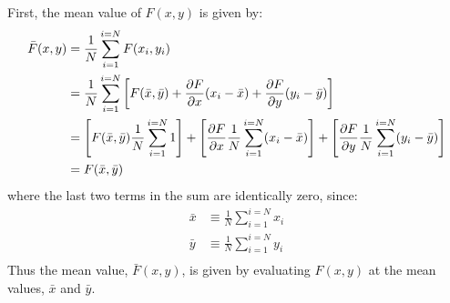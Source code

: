 First, the mean value of $F(x,y)$ is given by:
\begin{align}
\bar F(x,y)&=\frac{1}{N}\sum_{i=1}^{i=N}F(x_i,y_i)\nonumber\\
&=\frac{1}{N}\sum_{i=1}^{i=N} \left[ F(\bar x,\bar y)+\frac{\partial F}{\partial x}(x_i-\bar x)+\frac{\partial F}{\partial y}(y_i-\bar y)  \right]\nonumber\\
&=\left[F(\bar x,\bar y)\frac{1}{N}\sum_{i=1}^{i=N}1 \right]+\left[\frac{\partial F}{\partial x}\frac{1}{N}\sum_{i=1}^{i=N}(x_i-\bar x) \right]+\left[\frac{\partial F}{\partial y}\frac{1}{N}\sum_{i=1}^{i=N}(y_i-\bar y) \right]\nonumber\\
&=F(\bar x,\bar y)
\end{align}
where the last two terms in the sum are identically zero, since:
\begin{align}
\bar x &\equiv \frac{1}{N}\sum_{i=1}^{i=N}x_i\nonumber\\
\bar y &\equiv \frac{1}{N}\sum_{i=1}^{i=N}y_i\nonumber\\
\end{align} 
Thus the mean value, $\bar F(x,y)$, is given by evaluating $F(x,y)$ at the mean values, $\bar x$ and $\bar y$.

